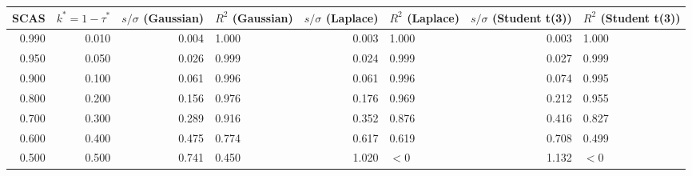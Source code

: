 \begin{tabular}{rrrlrlrl}
\toprule
SCAS & $k^*=1-\tau^*$ & $s/\sigma$ (Gaussian) & $R^2$ (Gaussian) & $s/\sigma$ (Laplace) & $R^2$ (Laplace) & $s/\sigma$ (Student t(3)) & $R^2$ (Student t(3)) \\
\midrule
0.990 & 0.010 & 0.004 & 1.000 & 0.003 & 1.000 & 0.003 & 1.000 \\
0.950 & 0.050 & 0.026 & 0.999 & 0.024 & 0.999 & 0.027 & 0.999 \\
0.900 & 0.100 & 0.061 & 0.996 & 0.061 & 0.996 & 0.074 & 0.995 \\
0.800 & 0.200 & 0.156 & 0.976 & 0.176 & 0.969 & 0.212 & 0.955 \\
0.700 & 0.300 & 0.289 & 0.916 & 0.352 & 0.876 & 0.416 & 0.827 \\
0.600 & 0.400 & 0.475 & 0.774 & 0.617 & 0.619 & 0.708 & 0.499 \\
0.500 & 0.500 & 0.741 & 0.450 & 1.020 & $<0$ & 1.132 & $<0$ \\
\bottomrule
\end{tabular}
